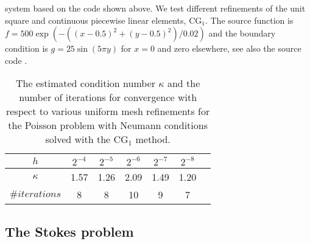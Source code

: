 system based on the code shown above. We test different
refinements of the unit square and continuous piecewise linear
elements, $\mathrm{CG}_1$. The source function is $f=
500\exp(-((x-0.5)^2 + (y-0.5)^2)/0.02)$ and the boundary condition is
$g = 25 \sin(5\pi y)$ for $x=0$ and zero elsewhere, see also the
source code .
\begin{table}
  \centering
  \begin{tabular}{ccccccc}
    \toprule
    $h$ & $2^{-4}$ & $2^{-5}$ & $2^{-6}$ & $2^{-7}$ & $2^{-8}$ \\
    \midrule
    $\kappa$ & 1.57 & 1.26 & 2.09 & 1.49 & 1.20 \\
    $\#iterations$ & 8 & 8 & 10 & 9 & 7 \\
    \bottomrule
  \end{tabular}
  \caption{The estimated condition number $\kappa$ and the number of
    iterations for convergence with respect to various uniform mesh
    refinements for the Poisson problem with Neumann conditions solved
    with the $\mathrm{CG}_1$ method.}\label{tabel:neumann}
\end{table}

\subsection{The Stokes problem}

